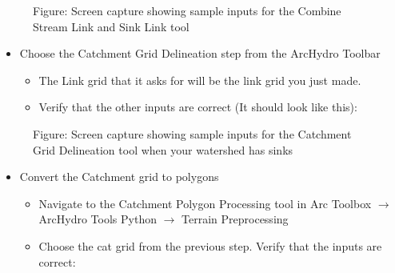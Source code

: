 \documentclass[letterpaper,10pt,english]{sphinxmanual}
\begin{document}
\begin{figure}[htbp]
\centering
\capstart

\noindent{}
\caption{Figure: Screen capture showing sample inputs for the Combine Stream Link and Sink Link tool}\label{\detokenize{ex_2:id12}}\end{figure}
\begin{itemize}
\item {} 
Choose the Catchment Grid Delineation step from the ArcHydro Toolbar
\begin{itemize}
\item {} 
The Link grid that it asks for will be the link grid you just made.

\item {} 
Verify that the other inputs are correct (It should look like this):

\end{itemize}

\end{itemize}

\begin{figure}[htbp]
\centering
\capstart

\noindent{}
\caption{Figure: Screen capture showing sample inputs for the Catchment Grid Delineation tool when your watershed has sinks}\label{\detokenize{ex_2:id13}}\end{figure}
\begin{itemize}
\item {} 
Convert the Catchment grid to polygons
\begin{itemize}
\item {} 
Navigate to the Catchment Polygon Processing tool in Arc Toolbox \(\rightarrow\) ArcHydro Tools Python \(\rightarrow\) Terrain Preprocessing

\item {} 
Choose the cat grid from the previous step. Verify that the inputs are correct:

\end{itemize}

\end{itemize}
\end{document}
